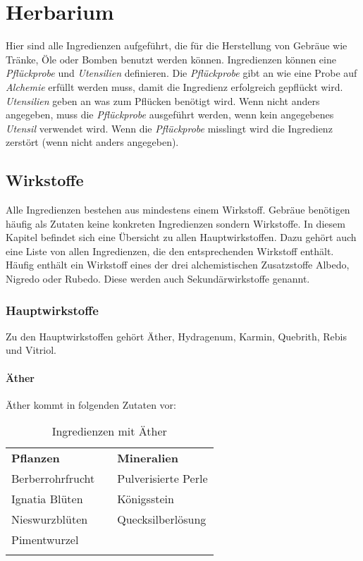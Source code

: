 {\let\clearpage\relax\chapter{Herbarium}}
Hier sind alle Ingredienzen aufgeführt, die für die Herstellung von Gebräue wie Tränke, Öle oder Bomben benutzt werden können. Ingredienzen können eine \textit{Pflückprobe} und \textit{Utensilien} definieren. Die \textit{Pflückprobe} gibt an wie eine Probe auf \textit{Alchemie} erfüllt werden muss, damit die Ingredienz erfolgreich gepflückt wird. \textit{Utensilien} geben an was zum Pflücken benötigt wird. Wenn nicht anders angegeben, muss die \textit{Pflückprobe} ausgeführt werden, wenn kein angegebenes \textit{Utensil} verwendet wird. Wenn die \textit{Pflückprobe} misslingt wird die Ingredienz zerstört (wenn nicht anders angegeben).

\section{Wirkstoffe}
Alle Ingredienzen bestehen aus mindestens einem Wirkstoff. Gebräue benötigen häufig als Zutaten keine konkreten Ingredienzen sondern Wirkstoffe. In diesem Kapitel befindet sich eine Übersicht zu allen Hauptwirkstoffen. Dazu gehört auch eine Liste von allen Ingredienzen, die den entsprechenden Wirkstoff enthält. Häufig enthält ein Wirkstoff eines der drei alchemistischen Zusatzstoffe Albedo, Nigredo oder Rubedo. Diese werden auch Sekundärwirkstoffe genannt. 

\subsection{Hauptwirkstoffe}
Zu den Hauptwirkstoffen gehört Äther, Hydragenum, Karmin, Quebrith, Rebis und Vitriol. 

\subsubsection{Äther}
Äther kommt in folgenden Zutaten vor:
\begin{longtable}{p{5cm}p{2cm}p{5cm}}
\textbf{Pflanzen} & & \textbf{Mineralien} \\ \cline{1-1} \cline{3-3}
Berberrohrfrucht & & Pulverisierte Perle \\ 
Ignatia Blüten & & Königsstein \\ 
Nieswurzblüten  & & Quecksilberlösung \\ 
Pimentwurzel & &  \\ 

\caption{Ingredienzen mit Äther}
\label{tab:ingredienzen_mit_aether}
\end{longtable}


